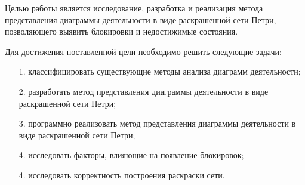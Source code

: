 Целью работы является исследование, разработка и реализация метода представления диаграммы деятельности в виде раскрашенной сети Петри, позволяющего выявить блокировки и недостижимые состояния.

Для достижения поставленной цели необходимо решить следующие задачи:
\begin{itemize}
\item[1.] классифицировать существующие методы анализа диаграмм деятельности;
\item[2.] разработать метод представления диаграммы деятельности в виде раскрашенной сети Петри;
\item[3.] программно реализовать метод представления диаграммы деятельности в виде раскрашенной сети Петри;
\item[4.] исследовать факторы, влияющие на появление блокировок;
\item[4.] исследовать корректность построения раскраски сети.
\end{itemize}
